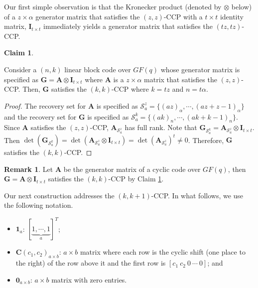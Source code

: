 \documentclass[journal,twocolumn]{IEEEtran}
\theoremstyle{definition}
\newtheorem{claim}{Claim}
\newtheorem{remark}{Remark}
\newcommand{\calS}{\mathcal{S}}
\newcommand{\bfG}{\mathbf{G}}
\newcommand{\bfI}{\mathbf{I}}
\newcommand{\bfC}{\mathbf{C}}
\newcommand{\bfA}{\mathbf{A}}
\newcommand{\bfzr}{\mathbf{0}}
\newcommand{\bfoe}{\mathbf{1}}
\newcommand{\litang}[1]{\marginpar{+}{\bf Li's remark}: {\em #1}}
\begin{document}
Our first simple observation is that the Kronecker product (denoted by $\otimes$ below) of a $z \times \alpha$ generator matrix that satisfies the $(z,z)$-CCP with a $t \times t$ identity matrix, $\bfI_{t\times t}$ immediately yields a generator matrix that satisfies the $(tz,tz)$-CCP.
%
\begin{claim}
	\label{claim:GconstructKKCCP}

	Consider a $(n,k)$ linear block code over $GF(q)$ whose generator matrix is specified as $\bfG=\bfA\otimes \bfI_{t\times t}$ where $\bfA$ is a $z\times \alpha$ matrix that satisfies the $(z,z)$-CCP. Then, $\bfG$ satisfies the $(k,k)$-CCP  where $k=tz$ and $n=t\alpha$.
\end{claim}
\begin{proof}
	The recovery set for $\bfA$ is specified as $\calS_a^z=\{(az)_\alpha,\cdots, (az+z-1)_\alpha\}$ and the recovery set for $\bfG$ is specified as $\calS_a^k=\{(ak)_n, \cdots, (ak+k-1)_n\}$. Since $\bfA$ satisfies the $(z,z)$-CCP, $\bfA_{\calS_a^z}$ has full rank.  Note that $\bfG_{\calS_a^k}=\bfA_{\calS_a^z}\otimes \bfI_{t\times t}$. Then $\det(\bfG_{\calS_a^k})=\det(\bfA_{\calS_a^z}\otimes \bfI_{t\times t})=\det(\bfA_{\calS_a^z})^t\neq 0$. Therefore, $\bfG$ satisfies the $(k,k)$-CCP. %
\end{proof}
\begin{remark}
Let $\bfA$ be the generator matrix of a cyclic code over $GF(q)$, then $\bfG=\bfA \otimes \bfI_{t\times t}$ satisfies the $(k,k)$-CCP by Claim \ref{claim:GconstructKKCCP}.
\end{remark}
Our next construction addresses the $(k,k+1)$-CCP. In what follows, we use the following notation.
\begin{itemize}
	\item $\bfoe_a$: $[\underbrace{1,\cdots,1}_a]^T$;
	\item $\bfC(c_1, c_2)_{a\times b}$: $a\times b$ matrix where each row is the cyclic
	shift (one place to the right) of the row above it and the first row is $[c_1~ c_2~ 0~ \cdots~ 0]$; and
	\item $\bfzr_{a\times b}$: $a\times b$ matrix with zero entries.
\end{itemize}
\end{document}
